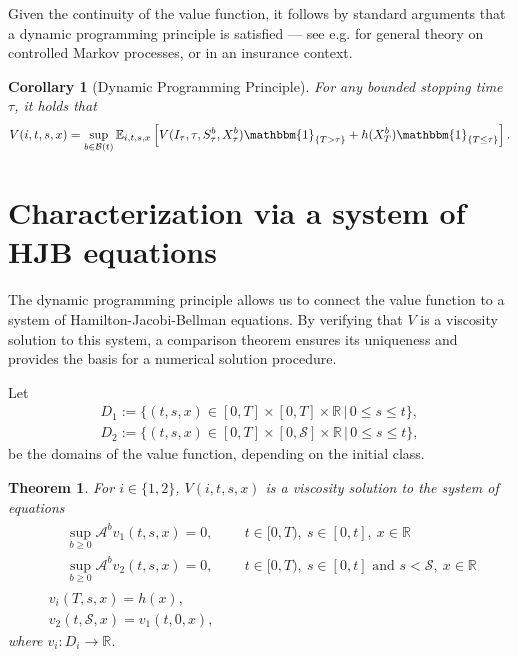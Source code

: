\documentclass[a4paper]{scrartcl}
\newtheorem{thm}{Theorem}[section]
\newtheorem{corollary}{Corollary}[section]
\theoremstyle{remark}
\theoremstyle{definition}
\numberwithin{equation}{section}
\newcommand{\ind}{\mathbbm{1}_}
\begin{document}
Given the continuity of the value function, it follows by standard arguments that a dynamic programming principle is satisfied --- see e.g. \citep{FlemingSoner2006} for general theory on controlled Markov processes, or \citep{Schmidli2008} in an insurance context.

\begin{corollary}[Dynamic Programming Principle]
    \label{cor:DPP}
    For any bounded stopping time $\tau$, it holds that
    \begin{align}
        V(i,t,s,x)= \sup_{b \in \mathcal{B}(t)} \mathbb{E}_{i,t,s,x}\left[ V(I_\tau,\tau,S_\tau^b,X_\tau^b) \ind{\{T>\tau\}} + h(X_T^b) \ind{\{T\leq\tau\}}\right].
    \end{align}
\end{corollary}

\newpage
\section{Characterization via a system of HJB equations}
\label{sec:HJB}
The dynamic programming principle allows us to connect the value function to a system of Hamilton-Jacobi-Bellman equations. By verifying that $V$ is a viscosity solution to this system, a comparison theorem ensures its uniqueness and provides the basis for a numerical solution procedure. 

Let \begin{align*}
    D_1:=\{(t,s,x) \in [0,T] \times [0,T] \times \mathbb{R}\,|\,0 \leq s \leq t  \},\\
    D_2:= \{(t,s,x) \in [0,T] \times [0,\mathcal{S}] \times \mathbb{R}\,|\,0 \leq s \leq t  \},
\end{align*}
be the domains of the value function, depending on the initial class. 
\begin{thm}
    For $i \in \{1,2\}$, $V(i,t,s,x)$ is a viscosity solution to the system of equations
    \begin{align}
        &\begin{aligned}
        &\sup_{b\geq 0} \mathcal{A}^b v_1(t,s,x)=0,\ \qquad  t \in [0,T),\ s\in [0,t],\ x \in \mathbb{R}\label{eq:diffequation}\\&\sup_{b\geq 0} \mathcal{A}^b v_2(t,s,x)=0,\ \qquad t \in [0,T),\ s\in [0,t] \text{ and } s<\mathcal{S}, \ x \in \mathbb{R} 
        \end{aligned}\\
        &v_i(T,s,x)=h(x),\\
        &v_2(t,\mathcal{S},x)=v_1(t,0,x),
    \end{align}
    where $v_i: D_i \rightarrow \mathbb{R}$.
\end{thm}
\end{document}
